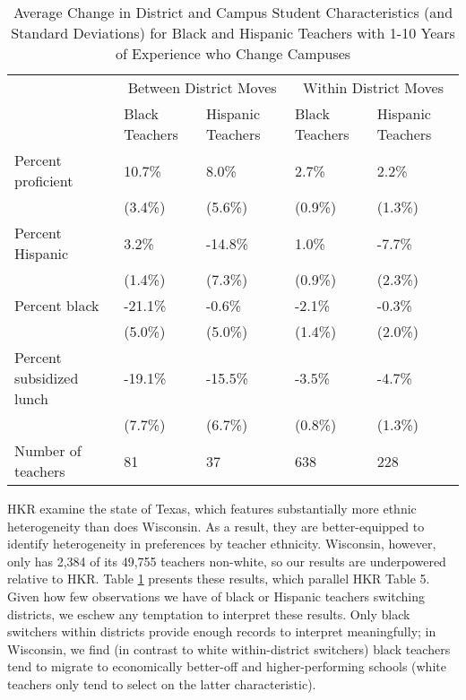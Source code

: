\documentclass[12pt,]{article}
\begin{document}
\begin{table}[htbp]
\centering
\begin{tabular}{lp{}p{}p{}p{}}
  \hline
 & \multicolumn{2}{c}{Between District Moves} & \multicolumn{2}{c}{Within District Moves}\\ \cline{2-5}
 & Black Teachers & Hispanic Teachers & Black Teachers & Hispanic Teachers \\
  \hline
Percent proficient & 10.7\% & 8.0\% & 2.7\% & 2.2\% \\ 
   & (3.4\%) & (5.6\%) & (0.9\%) & (1.3\%) \\ 
  Percent Hispanic & 3.2\% & -14.8\% & 1.0\% & -7.7\% \\ 
   & (1.4\%) & (7.3\%) & (0.9\%) & (2.3\%) \\ 
  Percent black & -21.1\% & -0.6\% & -2.1\% & -0.3\% \\ 
   & (5.0\%) & (5.0\%) & (1.4\%) & (2.0\%) \\ 
  Percent subsidized lunch & -19.1\% & -15.5\% & -3.5\% & -4.7\% \\ 
   & (7.7\%) & (6.7\%) & (0.8\%) & (1.3\%) \\ 
  Number of teachers & 81 & 37 & 638 & 228 \\ 
   \hline
\end{tabular}
\caption{Average Change in District and Campus Student Characteristics (and Standard Deviations) for Black and Hispanic Teachers with 1-10 Years of Experience who Change Campuses} 
\label{tbl:change_by_eth}
\end{table}

HKR examine the state of Texas, which features substantially more ethnic
heterogeneity than does Wisconsin. As a result, they are better-equipped
to identify heterogeneity in preferences by teacher ethnicity.
Wisconsin, however, only has 2,384 of its 49,755 teachers non-white, so
our results are underpowered relative to HKR. Table
\ref{tbl:change_by_eth} presents these results, which parallel HKR Table
5. Given how few observations we have of black or Hispanic teachers
switching districts, we eschew any temptation to interpret these
results. Only black switchers within districts provide enough records to
interpret meaningfully; in Wisconsin, we find (in contrast to white
within-district switchers) black teachers tend to migrate to
economically better-off and higher-performing schools (white teachers
only tend to select on the latter characteristic).
\end{document}
